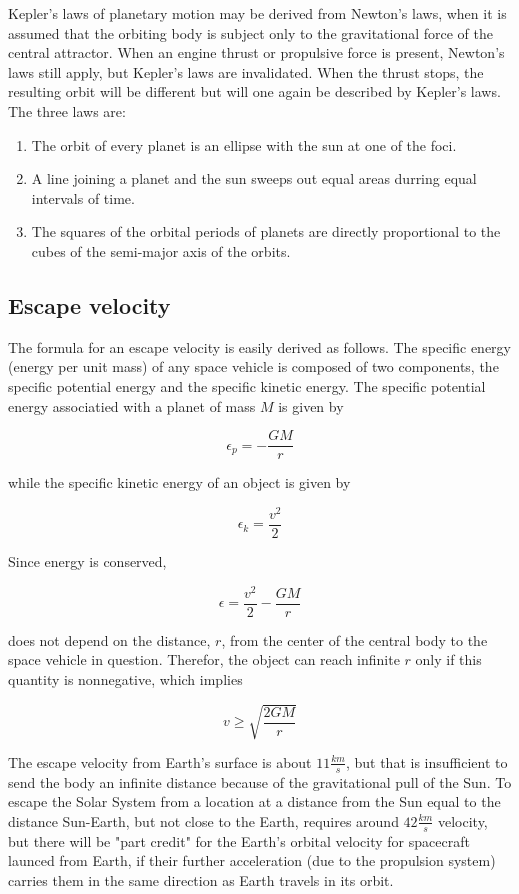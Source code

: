 \documentclass[12pt]{article}
\begin{document}
Kepler's laws of planetary motion may be derived from Newton's laws, when it is assumed that the orbiting body is subject only to the gravitational force of the central attractor. When an engine thrust or propulsive force is present, Newton's laws still apply, but Kepler's laws are invalidated. When the thrust stops, the resulting orbit will be different but will one again be described by Kepler's laws. The three laws are:

\begin{enumerate}
  \item The orbit of every planet is an ellipse with the sun at one of the foci.
  \item A line joining a planet and the sun sweeps out equal areas durring equal intervals of time.
  \item The squares of the orbital periods of planets are directly proportional to the cubes of the semi-major axis of the orbits.
\end{enumerate}
\subsection{Escape velocity}

The formula for an escape velocity is easily derived as follows. The specific energy (energy per unit mass) of any space vehicle is composed of two components, the specific potential energy and the specific kinetic energy. The specific potential energy associatied with a planet of mass \(M\) is given by

\[\epsilon_{p}=-\frac{GM}{r}\]

while the specific kinetic energy of an object is given by

\[\epsilon_{k}=\frac{v^{2}}{2}\]

Since energy is conserved,

\[\epsilon=\frac{v^{2}}{2}-\frac{GM}{r}\]

does not depend on the distance, \(r\), from the center of the central body to the space vehicle in question. Therefor, the object can reach infinite \(r\) only if this quantity is nonnegative, which implies

\[v\geq\sqrt{\frac{2GM}{r}}\]

The escape velocity from Earth's surface is about \(11\frac{km}{s}\), but that is insufficient to send the body an infinite distance because of the gravitational pull of the Sun. To escape the Solar System from a location at a distance from the Sun equal to the distance Sun-Earth, but not close to the Earth, requires around \(42\frac{km}{s}\) velocity, but there will be "part credit" for the Earth's orbital velocity for spacecraft launced from Earth, if their further acceleration (due to the propulsion system) carries them in the same direction as Earth travels in its orbit.
\end{document}
